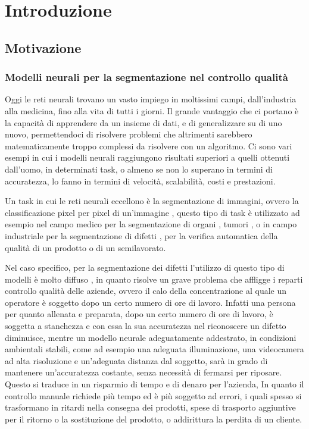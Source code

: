 \chapter{Introduzione}

\section{Motivazione \ok}

\subsection{Modelli neurali per la segmentazione nel controllo qualità\ok}

Oggi le reti neurali trovano un vasto impiego in moltissimi campi, dall'industria alla medicina, fino alla vita di tutti i giorni.
Il grande vantaggio che ci portano è la capacità di apprendere da un insieme di dati, e di generalizzare su di uno nuovo,
permettendoci di risolvere problemi che altrimenti sarebbero matematicamente troppo complessi da risolvere con un algoritmo.
Ci sono vari esempi in cui i modelli neurali raggiungono risultati superiori a quelli ottenuti dall'uomo, in determinati task,
o almeno se non lo superano in termini di accuratezza, lo fanno in termini di velocità, scalabilità, costi e prestazioni.

Un task in cui le reti neurali eccellono è la segmentazione di immagini, ovvero la classificazione pixel per pixel di un'immagine \cite{minaee2020image},
questo tipo di task è utilizzato ad esempio nel campo medico per la segmentazione di organi \cite{lei2020deep}, tumori \cite{havaei2015brain}, o in campo industriale per la segmentazione di difetti \cite{wong2021automatic}, per la verifica automatica della qualità di un prodotto o di un semilavorato.

Nel caso specifico, per la segmentazione dei difetti l'utilizzo di questo tipo di modelli è molto diffuso \cite{ieee2020dlqualitycontrol, zhu2021deep}, in quanto risolve un grave problema 
che affligge i reparti controllo qualità delle aziende, ovvero il calo della concentrazione al quale un operatore è soggetto dopo un certo numero di ore di lavoro.
Infatti una persona per quanto allenata e preparata, dopo un certo numero di ore di lavoro, è soggetta a stanchezza e con essa
la sua accuratezza nel riconoscere un difetto diminuisce, mentre un modello neurale adeguatamente addestrato, in condizioni ambientali stabili,
come ad esempio una adeguata illuminazione, una videocamera ad alta risoluzione e un'adeguata distanza dal soggetto, sarà in grado di mantenere 
un'accuratezza costante, senza necessità di fermarsi per riposare. Questo si traduce in un risparmio di tempo e di denaro per l'azienda,
In quanto il controllo manuale richiede più tempo ed è più soggetto ad errori, i quali spesso si trasformano in ritardi nella consegna dei prodotti,
spese di trasporto aggiuntive per il ritorno o la sostituzione del prodotto, o addirittura la perdita di un cliente.

